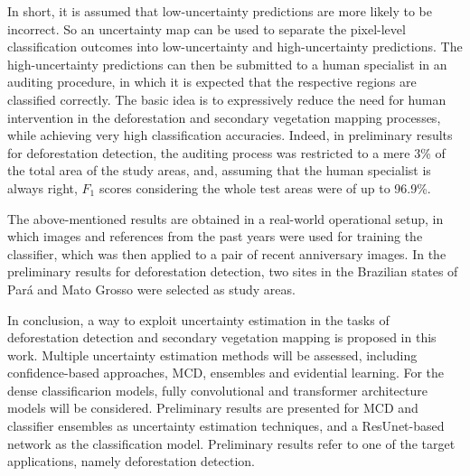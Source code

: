In short, it is assumed that low-uncertainty predictions are more likely to be incorrect. So an uncertainty map can be used to separate the pixel-level classification outcomes into low-uncertainty and high-uncertainty predictions. The high-uncertainty predictions can then be submitted to a human specialist in an auditing procedure, in which it is expected that the respective regions are classified correctly. The basic idea is to  expressively reduce the need for human intervention in the deforestation and secondary vegetation mapping processes, while achieving very high classification accuracies. Indeed, in preliminary results for deforestation detection, the auditing process was restricted to a mere 3\% of the total area of the study areas, and, assuming that the human specialist is always right, $F_1$ scores considering the whole test areas were of up to 96.9\%.


The above-mentioned results are obtained in a real-world operational setup, in which images and references from the past years were used for training the classifier, which was then applied to a pair of recent anniversary images. In the preliminary results for deforestation detection, two sites in the Brazilian states of Pará and Mato Grosso were selected as study areas.

In conclusion, a way to exploit uncertainty estimation in the tasks of deforestation detection and secondary vegetation mapping is proposed in this work. Multiple uncertainty estimation methods will be assessed, including confidence-based approaches, MCD, ensembles and evidential learning. For the dense classificarion models, fully convolutional and transformer architecture models will be considered. Preliminary results are presented for MCD and classifier ensembles as uncertainty estimation techniques, and a ResUnet-based network as the classification model. Preliminary results refer to one of the target applications, namely deforestation detection.


